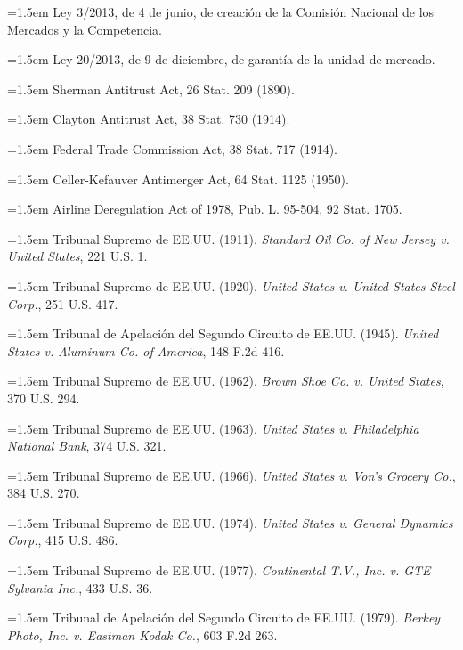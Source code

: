 \documentclass[10pt,a4paper]{article}
\begin{document}
\noindent\hangindent=1.5em Ley 3/2013, de 4 de junio, de creación de la Comisión Nacional de los Mercados y la Competencia.

\noindent\hangindent=1.5em Ley 20/2013, de 9 de diciembre, de garantía de la unidad de mercado.

\noindent\hangindent=1.5em Sherman Antitrust Act, 26 Stat. 209 (1890).

\noindent\hangindent=1.5em Clayton Antitrust Act, 38 Stat. 730 (1914).

\noindent\hangindent=1.5em Federal Trade Commission Act, 38 Stat. 717 (1914).

\noindent\hangindent=1.5em Celler-Kefauver Antimerger Act, 64 Stat. 1125 (1950).

\noindent\hangindent=1.5em Airline Deregulation Act of 1978, Pub. L. 95-504, 92 Stat. 1705.

\noindent\hangindent=1.5em Tribunal Supremo de EE.UU. (1911). \textit{Standard Oil Co. of New Jersey v. United States}, 221 U.S. 1.

\noindent\hangindent=1.5em Tribunal Supremo de EE.UU. (1920). \textit{United States v. United States Steel Corp.}, 251 U.S. 417.

\noindent\hangindent=1.5em Tribunal de Apelación del Segundo Circuito de EE.UU. (1945). \textit{United States v. Aluminum Co. of America}, 148 F.2d 416.

\noindent\hangindent=1.5em Tribunal Supremo de EE.UU. (1962). \textit{Brown Shoe Co. v. United States}, 370 U.S. 294.

\noindent\hangindent=1.5em Tribunal Supremo de EE.UU. (1963). \textit{United States v. Philadelphia National Bank}, 374 U.S. 321.

\noindent\hangindent=1.5em Tribunal Supremo de EE.UU. (1966). \textit{United States v. Von's Grocery Co.}, 384 U.S. 270.

\noindent\hangindent=1.5em Tribunal Supremo de EE.UU. (1974). \textit{United States v. General Dynamics Corp.}, 415 U.S. 486.

\noindent\hangindent=1.5em Tribunal Supremo de EE.UU. (1977). \textit{Continental T.V., Inc. v. GTE Sylvania Inc.}, 433 U.S. 36.

\noindent\hangindent=1.5em Tribunal de Apelación del Segundo Circuito de EE.UU. (1979). \textit{Berkey Photo, Inc. v. Eastman Kodak Co.}, 603 F.2d 263.
\end{document}
